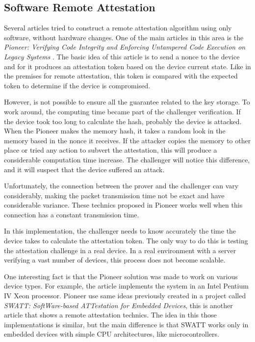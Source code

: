 \subsection{Software Remote Attestation}

Several articles tried to construct a remote attestation algorithm using only software, without hardware changes. One of  the main articles in this area is the \textit{Pioneer: Verifying Code Integrity and Enforcing
Untampered Code Execution on Legacy Systems} \cite{pionner}. The basic idea of this article is to send a nonce to the device and for it produces an attestation token based on the device current state. Like in the premises for remote attestation, this token is compared with the expected token to determine if the device is compromised.

However, is not possible to ensure all the guarantee related to the key storage. To work around, the computing time became part of the challenger verification. If the device took too long to calculate the hash, probably the device is attacked. When the Pioneer makes the memory hash, it takes a random look in the memory based in the nonce it receives. If the attacker copies the memory to other place or tried any action to subvert the attestation, this will produce a considerable computation time increase.     The challenger will notice this difference, and it will suspect that the device suffered an attack.

Unfortunately, the connection between the prover and the challenger can vary considerably, making the packet transmission time not be exact and have considerable variance. These technics proposed in Pioneer works well when this connection has a constant transmission time. 

In this implementation, the challenger needs to know accurately the time the device takes to calculate the attestation token. The only way to do this is testing the attestation challenge in a real device. In a real environment with a server verifying a vast number of devices, this process does not become scalable. 

One interesting fact is that the Pioneer solution was made to work on various device types. For example, the article implements the system in an Intel Pentium IV Xeon processor. Pioneer use same ideas previously created in a project called \textit{SWATT: SoftWare-based ATTestation for Embedded Devices}\cite{SWATT}, this is another article that shows a remote attestation technics. The idea in this those implementations is similar, but the main difference is that SWATT works only in embedded devices with simple CPU architectures, like microcontrollers.

